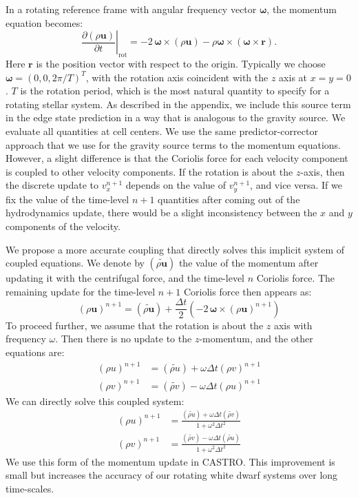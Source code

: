 \documentclass[iop]{emulateapj}
\begin{document}
In a rotating reference frame with angular frequency vector $\bm{\omega}$, the momentum equation becomes:
\begin{equation}
  \left.\frac{\partial(\rho \mathbf{u})}{\partial t}\right|_{\text{rot}} = -2\, {\bm\omega} \times (\rho\mathbf{u}) - \rho {\bm\omega} \times \left({\bm\omega} \times \mathbf{r}\right).
\end{equation}
Here $\mathbf{r}$ is the position vector with respect to the origin. Typically we choose $\bm{\omega} = (0, 0, 2\pi / T)^T$,
with the rotation axis coincident with the $z$ axis at $x = y = 0$.
$T$ is the rotation period, which is the most natural quantity to specify
for a rotating stellar system. As described in the appendix, we include this source term
in the edge state prediction in a way that is analogous to the gravity source.
We evaluate all quantities at cell centers. We use the same predictor-corrector 
approach that we use for the gravity source terms to the momentum equations. However, a slight 
difference is that the Coriolis force for each velocity component is coupled to other velocity 
components. If the rotation is about the $z$-axis, then the discrete update to 
$v_x^{n+1}$ depends on the value of $v_y^{n+1}$, and vice versa. If we fix the value of 
the time-level $n+1$ quantities after coming out of the hydrodynamics update, there 
would be a slight inconsistency between the $x$ and $y$ components of the velocity. 

We propose a more accurate coupling that directly solves this implicit system of coupled 
equations. We denote by $(\widetilde{\rho \mathbf{u}})$ the value of the momentum after 
updating it with the centrifugal force, and the time-level $n$ Coriolis force. The remaining 
update for the time-level $n+1$ Coriolis force then appears as:
\begin{equation}
  (\rho \mathbf{u})^{n+1} = (\widetilde{\rho\mathbf{u}}) + \frac{\Delta t}{2} \left(-2\, {\bm\omega} \times (\rho\mathbf{u})^{n+1}\right)
\end{equation}
To proceed further, we assume that the rotation is about the $z$ axis with frequency $\omega$. 
Then there is no update to the $z$-momentum, and the other equations are:
\begin{align}
  (\rho u)^{n+1} &= (\widetilde{\rho u}) + \omega \Delta t (\rho v)^{n+1} \\
  (\rho v)^{n+1} &= (\widetilde{\rho v}) - \omega \Delta t (\rho u)^{n+1}
\end{align} 
We can directly solve this coupled system:
\begin{align}
  (\rho u)^{n+1} &= \frac{ (\widetilde{\rho u}) + \omega \Delta t (\widetilde{\rho v})}{1 + \omega^2 \Delta t^2} \\
  (\rho v)^{n+1} &= \frac{ (\widetilde{\rho v}) - \omega \Delta t (\widetilde{\rho u})}{1 + \omega^2 \Delta t^2}
\end{align}
We use this form of the momentum update in CASTRO. This improvement is small
but increases the accuracy of our rotating white dwarf systems over long time-scales.
\end{document}
